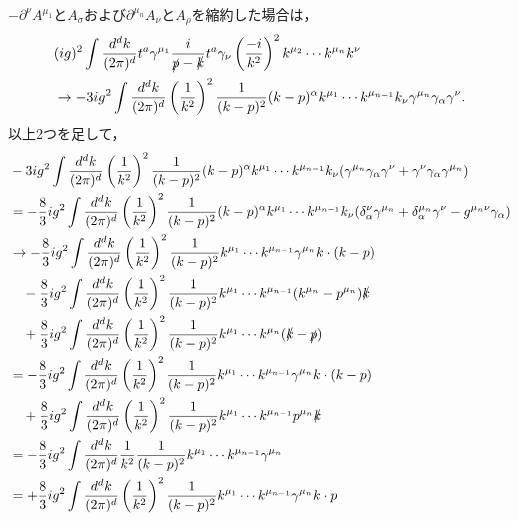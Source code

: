 $-\partial^\nu A^{\mu_1}$と$A_\sigma$および$\partial^{\mu_n}A_\nu$と$A_\rho$を縮約した場合は，
\begin{align*}
  & (ig)^2 \int \frac{d^dk}{(2\pi)^d} t^a \gamma^{\mu_1} \frac{i}{\slashed{p} - \slashed{k}} t^a \gamma_\nu
  \left( \frac{-i}{k^2} \right)^2 k^{\mu_2} \cdots k^{\mu_n} k^\nu \\
  &\to - 3 ig^2 \int\frac{d^dk}{(2\pi)^d} \left( \frac{1}{k^2} \right)^2 \frac{1}{(k-p)^2}
  (k-p)^\alpha k^{\mu_1} \cdots k^{\mu_{n-1}} k_\nu \gamma^{\mu_n} \gamma_\alpha \gamma^\nu .
\end{align*}
以上2つを足して，
\begin{align*}
  & - 3 ig^2 \int\frac{d^dk}{(2\pi)^d} \left( \frac{1}{k^2} \right)^2 \frac{1}{(k-p)^2}
  (k-p)^\alpha k^{\mu_1} \cdots k^{\mu_{n-1}} k_\nu (\gamma^{\mu_n} \gamma_\alpha \gamma^\nu + \gamma^\nu \gamma_\alpha \gamma^{\mu_n}) \\
  &= - \frac{8}{3} ig^2 \int\frac{d^dk}{(2\pi)^d} \left( \frac{1}{k^2} \right)^2 \frac{1}{(k-p)^2}
  (k-p)^\alpha k^{\mu_1} \cdots k^{\mu_{n-1}} k_\nu
  (\delta^\nu_\alpha \gamma^{\mu_n} + \delta^{\mu_n}_\alpha \gamma^\nu - g^{\mu_n\nu} \gamma_\alpha) \\
  &\to - \frac{8}{3} ig^2 \int\frac{d^dk}{(2\pi)^d} \left( \frac{1}{k^2} \right)^2 \frac{1}{(k-p)^2}
  k^{\mu_1} \cdots k^{\mu_{n-1}} \gamma^{\mu_n} k\cdot(k-p) \\
  &\quad - \frac{8}{3} ig^2 \int\frac{d^dk}{(2\pi)^d} \left( \frac{1}{k^2} \right)^2 \frac{1}{(k-p)^2}
  k^{\mu_1} \cdots k^{\mu_{n-1}} (k^{\mu_n}-p^{\mu_n}) \slashed{k} \\
  &\quad + \frac{8}{3} ig^2 \int\frac{d^dk}{(2\pi)^d} \left( \frac{1}{k^2} \right)^2 \frac{1}{(k-p)^2}
  k^{\mu_1} \cdots k^{\mu_n} (\slashed{k}-\slashed{p}) \\
  &= - \frac{8}{3} ig^2 \int\frac{d^dk}{(2\pi)^d} \left( \frac{1}{k^2} \right)^2 \frac{1}{(k-p)^2}
  k^{\mu_1} \cdots k^{\mu_{n-1}} \gamma^{\mu_n} k\cdot(k-p) \\
  &\quad + \frac{8}{3} ig^2 \int\frac{d^dk}{(2\pi)^d} \left( \frac{1}{k^2} \right)^2 \frac{1}{(k-p)^2}
  k^{\mu_1} \cdots k^{\mu_{n-1}} p^{\mu_n} \slashed{k} \\
  &= - \frac{8}{3} ig^2 \int\frac{d^dk}{(2\pi)^d} \frac{1}{k^2} \frac{1}{(k-p)^2}
  k^{\mu_1} \cdots k^{\mu_{n-1}} \gamma^{\mu_n} \\
  &= + \frac{8}{3} ig^2 \int\frac{d^dk}{(2\pi)^d} \left( \frac{1}{k^2} \right)^2 \frac{1}{(k-p)^2}
  k^{\mu_1} \cdots k^{\mu_{n-1}} \gamma^{\mu_n} k\cdot p \\

\end{align*}
